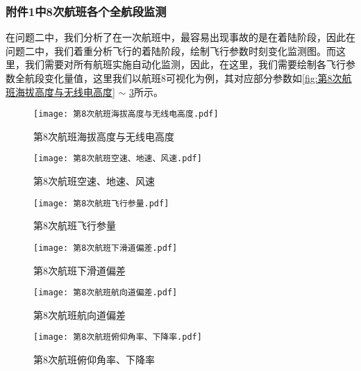 \documentclass{MathorCupModeling}
\begin{document}
	\subsubsection{附件1中8次航班各个全航段监测}
	在问题二中，我们分析了在一次航班中，最容易出现事故的是在着陆阶段，因此在问题二中，我们着重分析飞行的着陆阶段，绘制飞行参数时刻变化监测图。而这里，我们需要对所有航班实施自动化监测，因此，在这里，我们需要绘制各飞行参数全航段变化量值，这里我们以航班8可视化为例，其对应部分参数如\textcolor{blue}{\cref{fig:第8次航班海拔高度与无线电高度}} $\sim$ \textcolor{blue}{\cref{fig:第8次航班俯仰角率、下降率}}所示。
	\begin{figure}[H]
		\centering
		\begin{minipage}{0.48\linewidth}
			\centering
			\texttt{[image: 第8次航班海拔高度与无线电高度.pdf]}
			\caption{第8次航班海拔高度与无线电高度}
			\label{fig:第8次航班海拔高度与无线电高度}
		\end{minipage}
		\begin{minipage}{0.48\linewidth}
			\centering
			\texttt{[image: 第8次航班空速、地速、风速.pdf]}
			\caption{第8次航班空速、地速、风速}
			\label{fig:第8次航班空速、地速、风速}
		\end{minipage}
	\end{figure}
	\begin{figure}[H]
		\centering
		\begin{minipage}{0.48\linewidth}
			\centering
			\texttt{[image: 第8次航班飞行参量.pdf]}
			\caption{第8次航班飞行参量}
			\label{fig:第8次航班飞行参量}
		\end{minipage}
		\begin{minipage}{0.48\linewidth}
			\centering
			\texttt{[image: 第8次航班下滑道偏差.pdf]}
			\caption{第8次航班下滑道偏差}
			\label{fig:第8次航班下滑道偏差}
		\end{minipage}
	\end{figure}
	\begin{figure}[H]
		\centering
		\begin{minipage}{0.48\linewidth}
			\centering
			\texttt{[image: 第8次航班航向道偏差.pdf]}
			\caption{第8次航班航向道偏差}
			\label{fig:第8次航班航向道偏差}
		\end{minipage}
		\begin{minipage}{0.48\linewidth}
			\centering
			\texttt{[image: 第8次航班俯仰角率、下降率.pdf]}
			\caption{第8次航班俯仰角率、下降率}
			\label{fig:第8次航班俯仰角率、下降率}
		\end{minipage}
	\end{figure}
\end{document}
